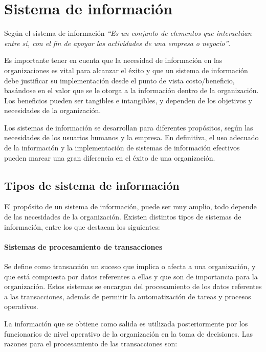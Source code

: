 \section{Sistema de información }

Según\cite{kendall2005analisis} el sistema de información\textit{ “Es un conjunto de elementos que interactúan entre sí, con el fin de apoyar las actividades de una empresa o negocio”}.

Es importante tener en cuenta que la necesidad de información en las organizaciones es vital para alcanzar el éxito y que un sistema de información debe justificar su implementación desde el punto de vista costo/beneficio, basándose en el valor que se le otorga a la información dentro de la organización. Los beneficios pueden ser tangibles e intangibles, y dependen de los objetivos y necesidades de la organización.

Los sistemas de información se desarrollan para diferentes propósitos, según las necesidades de los usuarios humanos y la empresa. En definitiva, el uso adecuado de la información y la implementación de sistemas de información efectivos pueden marcar una gran diferencia en el éxito de una organización.

\subsection{ Tipos de sistema de información}

El propósito de un sistema de información, puede ser muy amplio, todo depende de las necesidades de la organización. Existen distintos tipos de sistemas de información, entre los que destacan los siguientes\cite{kendall2005analisis}:

\setcounter{secnumdepth}{3}
\paragraph{Sistemas de procesamiento de transacciones}

Se define como transacción un suceso que implica o afecta a una organización, y que está compuesta por datos referentes a ellas y que son de importancia para la organización\cite{kendall2005analisis}. Estos sistemas se encargan del procesamiento de los datos referentes a las transacciones, además de permitir la automatización de tareas y procesos operativos. 

La información que se obtiene como salida es utilizada posteriormente por los funcionarios de nivel operativo de la organización en la toma de decisiones. Las razones para el procesamiento de las transacciones son:  

